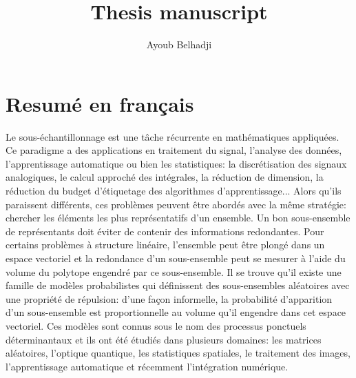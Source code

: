 \documentclass[twoside,11pt]{book}
\numberwithin{theorem}{chapter}
\numberwithin{definition}{chapter}
\numberwithin{proposition}{chapter}
\numberwithin{corollary}{chapter}
\numberwithin{example}{chapter}
\numberwithin{lemma}{chapter}
\numberwithin{assumption}{chapter}
\numberwithin{equation}{chapter}
\numberwithin{figure}{chapter}
\begin{document}
\title{Thesis manuscript}

%
\author{Ayoub Belhadji} %
 









\section{Resumé en français}\label{chap:introduction}
Le sous-échantillonnage est une tâche récurrente en mathématiques appliquées. Ce paradigme a des applications en traitement du signal, l'analyse des données, l'apprentissage automatique ou bien les statistiques: la discrétisation des signaux analogiques, le calcul approché des intégrales, la réduction de dimension, la réduction du budget d’étiquetage des algorithmes d'apprentissage... Alors qu'ils paraissent différents, ces problèmes peuvent être abordés avec la même stratégie: chercher les éléments les plus représentatifs d'un ensemble. 
Un bon sous-ensemble de représentants doit éviter de contenir des informations redondantes. Pour certains problèmes à structure linéaire, l'ensemble peut être plongé dans un espace vectoriel et la redondance d'un sous-ensemble peut se mesurer à l'aide du volume du polytope engendré par ce sous-ensemble. Il se trouve qu'il existe une famille de modèles probabilistes qui définissent des sous-ensembles aléatoires avec une propriété de répulsion: d'une façon informelle, la probabilité d'apparition d'un sous-ensemble est proportionnelle au volume qu'il engendre dans cet espace vectoriel. Ces modèles sont connus sous le nom des processus ponctuels déterminantaux et ils ont été étudiés dans plusieurs domaines: les matrices aléatoires, l'optique quantique, les statistiques spatiales, le traitement des images, l'apprentissage automatique et récemment l'intégration numérique.
 
\end{document}

